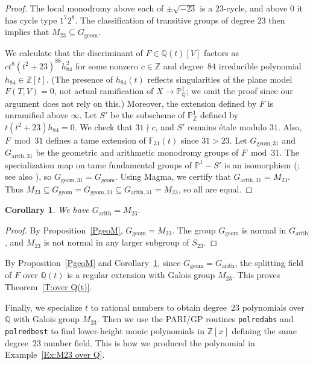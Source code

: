\documentclass[12pt,reqno]{amsart}
\newcommand{\F}{\mathbb{F}}
\newcommand{\PP}{\mathbb{P}}
\newcommand{\Q}{\mathbb{Q}}
\newcommand{\Z}{\mathbb{Z}}
\newcommand{\arith}{\mathrm{arith}}
\newcommand{\geom}{\mathrm{geom}}
\newtheorem{corollary}[theorem]{Corollary}
\theoremstyle{definition}
\theoremstyle{remark}
\begin{document}
\begin{proof} 
The local monodromy above each of $\pm \sqrt{-23}$ is a $23$-cycle,
and above $0$ it has cycle type $1^7 2^8$.
The classification of transitive groups of degree $23$ then implies that $M_{23} \subseteq G_{\geom}$.

We calculate that the discriminant of $F \in \Q(t)[V]$ factors as $c t^8 (t^2+23)^{88} h_{84}^2$ for some nonzero $c \in \Z$ and degree~$84$ irreducible polynomial $h_{84} \in \Z[t]$.
(The presence of $h_{84}(t)$ reflects singularities of the plane model $F(T,V)=0$, not actual ramification of $X \to \PP^1_\Q$; we omit the proof since our argument does not rely on this.)
Moreover, the extension defined by $F$ is unramified above $\infty$.
Let $S'$ be the subscheme of $\PP^1_\Z$ defined by $t(t^2+23)h_{84}=0$.
We check that $31 \nmid c$, and $S'$ remains \'etale modulo $31$.
Also, $F \bmod 31$ defines a tame extension of $\F_{31}(t)$ since $31>23$.
Let $G_{\geom,31}$ and $G_{\arith,31}$ be the geometric and arithmetic monodromy groups of $F \bmod 31$.
The specialization map on tame fundamental groups of $\PP^1 - S'$ is an isomorphism (\cite[XIII.2]{SGA1}; see also \cite[Th\'eor\`eme~4.4]{Orgogozo-Vidal2000}), so $G_{\geom,31}=G_{\geom}$.
Using Magma, we certify that $G_{\arith,31} = M_{23}$.
Thus $M_{23} \subseteq G_{\geom} = G_{\geom,31} \subseteq G_{\arith,31} = M_{23}$,
so all are equal.
\end{proof}

\begin{corollary}
\label{C:G_arith}
We have $G_\arith=M_{23}$.
\end{corollary}

\begin{proof}
By Proposition~\ref{PgeoM}, $G_\geom = M_{23}$.
The group $G_\geom$ is normal in $G_\arith$,
and $M_{23}$ is not normal in any larger subgroup of $S_{23}$.
\end{proof}

By Proposition~\ref{PgeoM} and Corollary~\ref{C:G_arith},
since $G_\geom = G_\arith$, the splitting field of $F$ over $\Q(t)$ is a regular extension
with Galois group $M_{23}$.  This proves Theorem~\ref{T:over Q(t)}.

Finally, we specialize $t$ to rational numbers to obtain degree~$23$ polynomials over $\Q$ with Galois group $M_{23}$.  Then we use the PARI/GP routines \texttt{polredabs} and \texttt{polredbest} \cite{Cohen1991, PARI} to find lower-height monic polynomials in $\Z[x]$ defining the same degree~$23$ number field.
This is how we produced the polynomial in Example~\ref{Ex:M23 over Q}.
\end{document}
